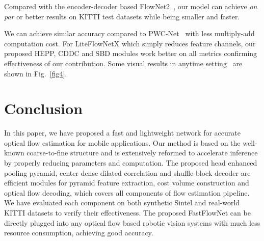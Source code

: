 \documentclass[letterpaper, 10 pt, conference]{ieeeconf}
\begin{document}
Compared with the encoder-decoder based FlowNet2~\cite{Ilg_2017}, our model can achieve \textit{on par }
or better results on KITTI test datasets while being  smaller and  faster.

We can achieve  similar accuracy compared 
to PWC-Net~\cite{Sun_2018_CVPR} with  less multiply-add computation cost. 
For LiteFlowNetX which simply reduces feature channels, our
proposed HEPP, CDDC and SBD modules work better on all metrics confirming effectiveness of our contribution. Some visual results in anytime setting~\cite{8794003, dovesi2019realtime} are  shown 
in Fig.~\ref{fig4}.


\section{Conclusion}
In this paper, we have proposed a fast and lightweight network for accurate optical flow estimation for 
mobile applications. Our method is based on the well-known coarse-to-fine structure and is extensively reformed to accelerate inference by properly reducing parameters and computation. The proposed head enhanced pooling pyramid, center dense dilated correlation and shuffle block decoder are efficient modules for pyramid feature extraction, cost volume construction and optical flow decoding, which 
covers all components of flow estimation pipeline. We have evaluated each component on both synthetic Sintel and real-world KITTI datasets to verify their effectiveness. The proposed FastFlowNet can be directly plugged into any optical flow based robotic vision systems with much less resource consumption,
achieving good accuracy. 








\end{document}
